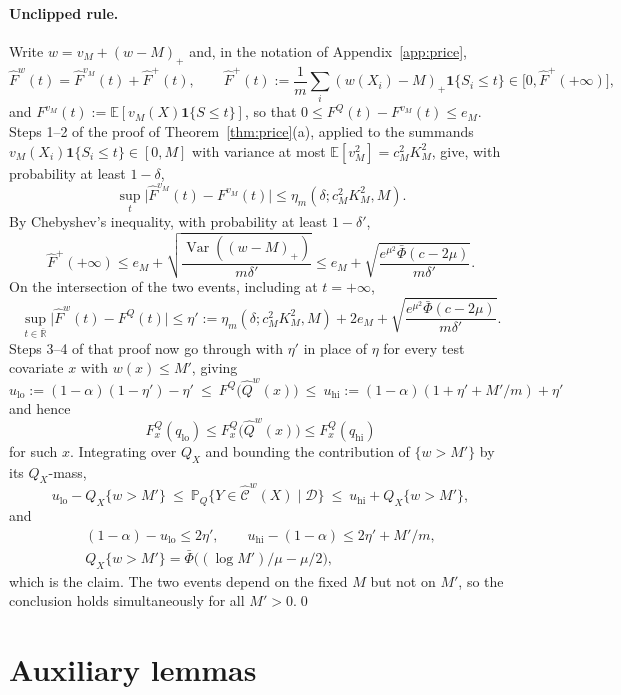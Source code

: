 \documentclass[11pt,a4paper]{article}
\newcommand{\QX}{Q_X}
\newcommand{\E}{\mathbb{E}}
\newcommand{\Prob}{\mathbb{P}}
\newcommand{\Rbar}{\overline{\mathbb{R}}}
\newcommand{\Cset}{\widehat{\mathcal C}}
\newcommand{\ind}{\mathbf 1}
\theoremstyle{plain}
\theoremstyle{definition}
\theoremstyle{remark}
\begin{document}
\paragraph{Unclipped rule.} Write $w=v_M+(w-M)_+$ and, in the notation of Appendix~\ref{app:price},
\[
\widehat F^w(t)=\widehat F^{v_M}(t)+\widehat F^+(t),\qquad
\widehat F^+(t):=\frac1m\sum_i(w(X_i)-M)_+\ind\{S_i\le t\}\in\bigl[0,\widehat F^+(+\infty)\bigr],
\]
and $F^{v_M}(t):=\E[v_M(X)\ind\{S\le t\}]$, so that $0\le F^Q(t)-F^{v_M}(t)\le e_M$. Steps 1--2 of the proof of Theorem~\ref{thm:price}(a), applied to the summands $v_M(X_i)\ind\{S_i\le t\}\in[0,M]$ with variance at most $\E[v_M^2]=c_M^2K_M^2$, give, with probability at least $1-\delta$,
\[
\sup_t\bigl|\widehat F^{v_M}(t)-F^{v_M}(t)\bigr|\le\eta_m(\delta;c_M^2K_M^2,M).
\]
By Chebyshev's inequality, with probability at least $1-\delta'$,
\[
\widehat F^+(+\infty)\le e_M+\sqrt{\frac{\operatorname{Var}((w-M)_+)}{m\delta'}}\le e_M+\sqrt{\frac{e^{\mu^2}\bar\Phi(c-2\mu)}{m\delta'}}.
\]
On the intersection of the two events, including at $t=+\infty$,
\[
\sup_{t\in\Rbar}\bigl|\widehat F^w(t)-F^Q(t)\bigr|\le\eta':=\eta_m(\delta;c_M^2K_M^2,M)+2e_M+\sqrt{\frac{e^{\mu^2}\bar\Phi(c-2\mu)}{m\delta'}}.
\]
Steps 3--4 of that proof now go through with $\eta'$ in place of $\eta$ for every test covariate $x$ with $w(x)\le M'$, giving
\[
u_{\mathrm{lo}}:=(1-\alpha)(1-\eta')-\eta'\ \le\ F^Q\bigl(\widehat Q^w(x)\bigr)\ \le\ u_{\mathrm{hi}}:=(1-\alpha)(1+\eta'+M'/m)+\eta'
\]
and hence
\[
F^Q_x(q_{\mathrm{lo}})\le F^Q_x\bigl(\widehat Q^w(x)\bigr)\le F^Q_x(q_{\mathrm{hi}})
\]
for such $x$. Integrating over $\QX$ and bounding the contribution of $\{w>M'\}$ by its $\QX$-mass,
\[
u_{\mathrm{lo}}-\QX\{w>M'\}\ \le\ \Prob_Q\{Y\in\Cset^w(X)\mid\mathcal D\}\ \le\ u_{\mathrm{hi}}+\QX\{w>M'\},
\]
and
\begin{gather*}
(1-\alpha)-u_{\mathrm{lo}}\le2\eta',\qquad u_{\mathrm{hi}}-(1-\alpha)\le2\eta'+M'/m,\\
\QX\{w>M'\}=\bar\Phi\bigl((\log M')/\mu-\mu/2\bigr),
\end{gather*}
which is the claim. The two events depend on the fixed $M$ but not on $M'$, so the conclusion holds simultaneously for all $M'>0$.\qed

\section{Auxiliary lemmas}\label{app:aux}
\end{document}

